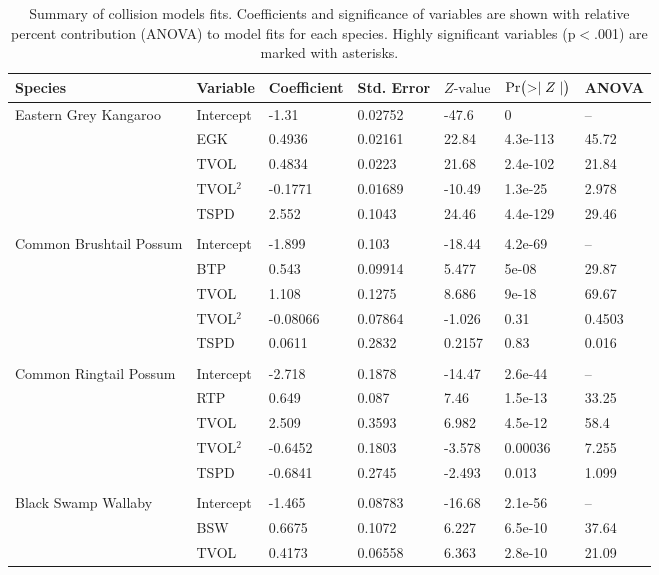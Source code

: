 \begin{table}[htp]
\caption[Summary of collision models for six mammal species]{Summary of collision models fits. Coefficients and significance of variables are shown with relative percent contribution (ANOVA) to model fits for each species.  Highly significant variables (p$<$.001) are marked with asterisks.}
\begin{tabularx}{\textwidth}{lllllll} \toprule
Species & Variable & Coefficient & Std. Error & $Z\text{-value}$ & $\text{Pr}\bigl( >\mid Z \mid \bigr)$ & ANOVA \\ 
\midrule
Eastern Grey Kangaroo & Intercept & -1.31 & 0.02752 & -47.6 & 0 & -- \\ 
   & EGK & 0.4936 & 0.02161 & 22.84 & 4.3e-113 & 45.72 \\ 
   & TVOL & 0.4834 & 0.0223 & 21.68 & 2.4e-102 & 21.84 \\ 
   & TVOL$^2$ & -0.1771 & 0.01689 & -10.49 & 1.3e-25 & 2.978 \\ 
   & TSPD & 2.552 & 0.1043 & 24.46 & 4.4e-129 & 29.46 \\ 
   &  &  &  &  &  &  \\ 
Common Brushtail Possum & Intercept & -1.899 & 0.103 & -18.44 & 4.2e-69 & -- \\ 
   & BTP & 0.543 & 0.09914 & 5.477 & 5e-08 & 29.87 \\ 
   & TVOL & 1.108 & 0.1275 & 8.686 & 9e-18 & 69.67 \\ 
   & TVOL$^2$ & -0.08066 & 0.07864 & -1.026 & 0.31 & 0.4503 \\ 
   & TSPD & 0.0611 & 0.2832 & 0.2157 & 0.83 & 0.016 \\ 
   &  &  &  &  &  &  \\ 
Common Ringtail Possum & Intercept & -2.718 & 0.1878 & -14.47 & 2.6e-44 & -- \\ 
   & RTP & 0.649 & 0.087 & 7.46 & 1.5e-13 & 33.25 \\ 
   & TVOL & 2.509 & 0.3593 & 6.982 & 4.5e-12 & 58.4 \\ 
   & TVOL$^2$ & -0.6452 & 0.1803 & -3.578 & 0.00036 & 7.255 \\ 
   & TSPD & -0.6841 & 0.2745 & -2.493 & 0.013 & 1.099 \\ 
   &  &  &  &  &  &  \\ 
Black Swamp Wallaby & Intercept & -1.465 & 0.08783 & -16.68 & 2.1e-56 & -- \\ 
   & BSW & 0.6675 & 0.1072 & 6.227 & 6.5e-10 & 37.64 \\ 
   & TVOL & 0.4173 & 0.06558 & 6.363 & 2.8e-10 & 21.09 \\ 

\end{tabularx}
\end{table}
